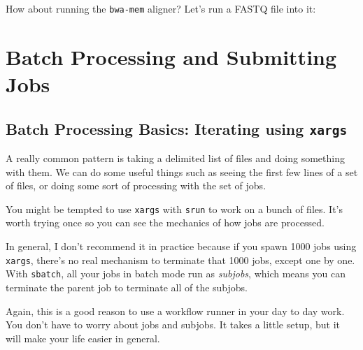 \documentclass[
  letterpaper,
  DIV=11,
  numbers=noendperiod]{scrreprt}
\newenvironment{Shaded}{\begin{snugshade}}{\end{snugshade}}
\newcommand{\CommentTok}[1]{\textcolor[rgb]{0.37,0.37,0.37}{#1}}
\newcommand{\ExtensionTok}[1]{\textcolor[rgb]{0.00,0.23,0.31}{#1}}
\newcommand{\NormalTok}[1]{\textcolor[rgb]{0.00,0.23,0.31}{#1}}
\newcommand{\OperatorTok}[1]{\textcolor[rgb]{0.37,0.37,0.37}{#1}}
\newcommand{\StringTok}[1]{\textcolor[rgb]{0.13,0.47,0.30}{#1}}
\newcommand{\VariableTok}[1]{\textcolor[rgb]{0.07,0.07,0.07}{#1}}
\begin{document}
How about running the \texttt{bwa-mem} aligner? Let's run a FASTQ file
into it:

\begin{Shaded}
\end{Shaded}


\chapter{Batch Processing and Submitting
Jobs}\label{batch-processing-and-submitting-jobs}

\section{\texorpdfstring{Batch Processing Basics: Iterating using
\texttt{xargs}}{Batch Processing Basics: Iterating using xargs}}\label{sec-xargs}

A really common pattern is taking a delimited list of files and doing
something with them. We can do some useful things such as seeing the
first few lines of a set of files, or doing some sort of processing with
the set of jobs.

\begin{tcolorbox}[enhanced jigsaw, colbacktitle=quarto-callout-warning-color!10!white, left=2mm, toprule=.15mm, toptitle=1mm, opacityback=0, bottomrule=.15mm, breakable, leftrule=.75mm, colframe=quarto-callout-warning-color-frame, bottomtitle=1mm, titlerule=0mm, coltitle=black, title=\textcolor{quarto-callout-warning-color}{\faExclamationTriangle}\hspace{0.5em}{Don't \texttt{xargs} for HPC jobs}, rightrule=.15mm, arc=.35mm, opacitybacktitle=0.6, colback=white]

You might be tempted to use \texttt{xargs} with \texttt{srun} to work on
a bunch of files. It's worth trying once so you can see the mechanics of
how jobs are processed.

In general, I don't recommend it in practice because if you spawn 1000
jobs using \texttt{xargs}, there's no real mechanism to terminate that
1000 jobs, except one by one. With \texttt{sbatch}, all your jobs in
batch mode run as \emph{subjobs}, which means you can terminate the
parent job to terminate all of the subjobs.

Again, this is a good reason to use a workflow runner in your day to day
work. You don't have to worry about jobs and subjobs. It takes a little
setup, but it will make your life easier in general.

\end{tcolorbox}
\end{document}
